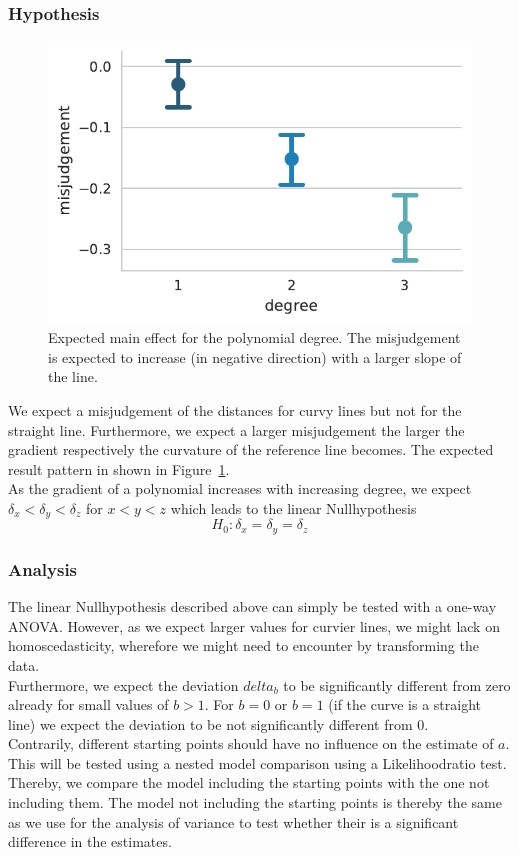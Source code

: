 \documentclass[a4paper, doc, draftall]{apa6}
\begin{document}
		\subsubsection{Hypothesis}
			\begin{figure}
				\centering
				\includegraphics[width=0.6\linewidth]{plots/results.pdf}
				\caption{Expected main effect for the polynomial degree. The misjudgement is expected to increase (in negative direction) with a larger slope of the line.}
				\label{results}
			\end{figure}
			We expect a misjudgement of the distances for curvy lines but not for the straight line. Furthermore, we expect a larger misjudgement the larger the gradient respectively the curvature of the reference line becomes. The expected result pattern in shown in Figure~\ref{results}.\\
			As the gradient of a polynomial increases with increasing degree, we expect $\delta_x < \delta_y < \delta_z$ for $x < y < z$ which leads to the linear Nullhypothesis 
			$$H_0: \delta_x = \delta_y = \delta_z$$
		
		\subsubsection{Analysis}
			The linear Nullhypothesis described above can simply be tested with a one-way ANOVA. However, as we expect larger values for curvier lines, we might lack on homoscedasticity, wherefore we might need to encounter by transforming the data.\\
			Furthermore, we expect the deviation $delta_b$ to be significantly different from zero already for small values of $b > 1$. For $b = 0$ or $b = 1$ (if the curve is a straight line) we expect the deviation to be not significantly different from $0$.\\
			Contrarily, different starting points should have no influence on the estimate of $a$. This will be tested using a nested model comparison using a Likelihoodratio test. Thereby, we compare the model including the starting points with the one not including them. The model not including the starting points is thereby the same as we use for the analysis of variance to test whether their is a significant difference in the estimates. 
	
\end{document}
